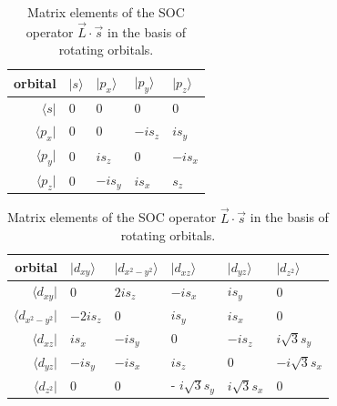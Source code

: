 \begin{table}[h!]
\begin{tabularx}{\textwidth}{|r| X X X X|}
\hline
orbital & $|s \rangle$ & $|p_x \rangle$ & $|p_y \rangle$ & $|p_z \rangle$ \\ \hline
$\langle s|$ & 0 & 0 & 0 & 0 \\
$\langle p_x|$ & 0 & 0 & $- i s_z$ & $i s_y$ \\
$\langle p_y|$ & 0 & $i s_{z} $ & 0 & $- i s_{x} $ \\
$\langle p_z|$ & 0 & $-i s_y$ & $i s_{x} $ & $s_z$ \\
\hline
\end{tabularx}
\newline
\vspace*{0.5 cm}
\newline
\begin{tabularx}{\textwidth}{|r| X X X X X|}
\hline
orbital & $|d_{xy} \rangle$ & $|d_{x^2-y^2}	\rangle$ & $|d_{xz} \rangle$ & $|d_{yz} \rangle$ & $|d_{z^2} \rangle $ \\ \hline
$\langle d_{xy}|$ & 0 & $2 i s_z $ & $-i s_x $ & $i s_y$ & 0\\
$\langle d_{x^2 - y^2}|$ & $-2 i s_z$ & $0$ & $i s_{y} $ & $i s_x $ & 0\\
$\langle d_{xz}|$ & $i s_x$ & $- i s_{y} $ & 0 & $-i s_{z} $ & $i \sqrt{3} s_y$\\
$\langle d_{yz}|$ & $- i s_y $ & $ - i s_x$ & $i s_{z} $ & $0$ & $-i \sqrt{3} s_x $\\
$\langle d_{z^2}|$ & 0 & 0 & - $i \sqrt{3} s_y$ & $i \sqrt{3} s_{x} $ & $0$\\
\hline
\end{tabularx}
\caption{Matrix elements of the SOC operator $\vec{L} \cdot \vec{s}$ in the basis of rotating orbitals.}
\label{tab:soc2}
\end{table}